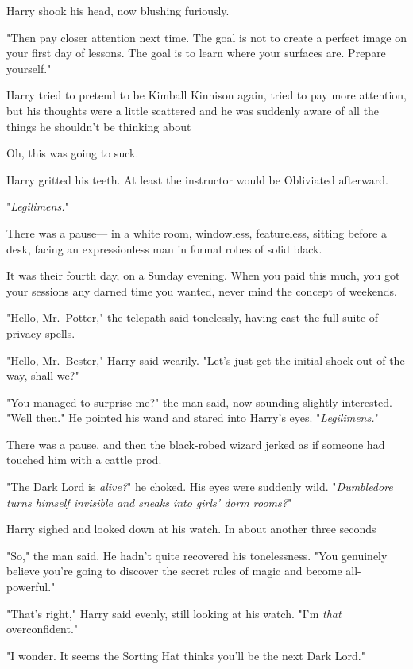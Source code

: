 Harry shook his head, now blushing furiously.

"Then pay closer attention next time. The goal is not to create a perfect image
on your first day of lessons. The goal is to learn where your surfaces are.
Prepare yourself."

Harry tried to pretend to be Kimball Kinnison again, tried to pay more
attention, but his thoughts were a little scattered and he was suddenly aware
of all the things he shouldn't be thinking about{\el}

Oh, this was going to suck.

Harry gritted his teeth. At least the instructor would be Obliviated afterward.

"\emph{Legilimens.}"

There was a pause\mbox{---}
\sbreak
{\el} in a white room, windowless, featureless, sitting before a desk, facing
an expressionless man in formal robes of solid black.

It was their fourth day, on a Sunday evening. When you paid this much, you got
your sessions any darned time you wanted, never mind the concept of weekends.

"Hello, Mr.~Potter," the telepath said tonelessly, having cast the full suite
of privacy spells.

"Hello, Mr.~Bester," Harry said wearily. "Let's just get the initial shock out
of the way, shall we?"

"You managed to surprise me?" the man said, now sounding slightly interested.
"Well then." He pointed his wand and stared into Harry's eyes.
"\emph{Legilimens.}"

There was a pause, and then the black-robed wizard jerked as if someone had
touched him with a cattle prod.

"The Dark Lord is \emph{alive?}" he choked. His eyes were suddenly wild.
"\emph{Dumbledore turns himself invisible and sneaks into girls' dorm rooms?}"

Harry sighed and looked down at his watch. In about another three
seconds{\el}

"So," the man said. He hadn't quite recovered his tonelessness. "You genuinely
believe you're going to discover the secret rules of magic and become
all-powerful."

"That's right," Harry said evenly, still looking at his watch. "I'm \emph{that}
overconfident."

"I wonder. It seems the Sorting Hat thinks you'll be the next Dark Lord."

